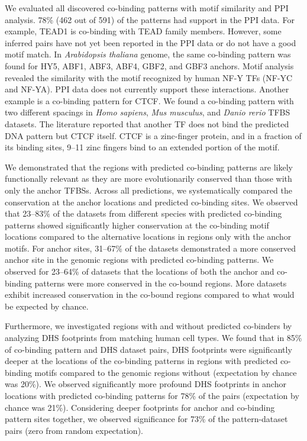 We evaluated all discovered co-binding patterns with motif similarity and PPI analysis. 78\% (462 out of 591) of the patterns had support in the PPI data. For example, TEAD1 is co-binding with TEAD family members. However, some inferred pairs have not yet been reported in the PPI data or do not have a good motif match. In \textit{Arabidopsis thaliana} genome, the same co-binding pattern was found for HY5, ABF1, ABF3, ABF4, GBF2, and GBF3 anchors. Motif analysis revealed the similarity with the motif recognized by human NF-Y TFs (NF-YC and NF-YA). PPI data does not currently support these interactions. Another example is a co-binding pattern for CTCF. We found a co-binding pattern with two different spacings in \textit{Homo sapiens}, \textit{Mus musculus}, and \textit{Danio rerio} TFBS datasets. The literature reported that another TF does not bind the predicted DNA pattern but CTCF itself. CTCF is a zinc-finger protein, and in a fraction of its binding sites, 9--11 zinc fingers bind to an extended portion of the motif.

We demonstrated that the regions with predicted co-binding patterns are likely functionally relevant as they are more evolutionarily conserved than those with only the anchor TFBSs. Across all predictions, we systematically compared the conservation at the anchor locations and predicted co-binding sites. We observed that 23--83\% of the datasets from different species with predicted co-binding patterns showed significantly higher conservation at the co-binding motif locations compared to the alternative locations in regions only with the anchor motifs. For anchor sites, 31--67\% of the datasets demonstrated a more conserved anchor site in the genomic regions with predicted co-binding patterns. We observed for 23--64\% of datasets that the locations of both the anchor and co-binding patterns were more conserved in the co-bound regions. More datasets exhibit increased conservation in the co-bound regions compared to what would be expected by chance.

Furthermore, we investigated regions with and without predicted co-binders by analyzing \ac{DHS} footprints from matching human cell types. We found that in 85\% of co-binding pattern and DHS dataset pairs, DHS footprints were significantly deeper at the locations of the co-binding patterns in regions with predicted co-binding motifs compared to the genomic regions without (expectation by chance was 20\%). We observed significantly more profound DHS footprints in anchor locations with predicted co-binding patterns for 78\% of the pairs (expectation by chance was 21\%). Considering deeper footprints for anchor and co-binding pattern sites together, we observed significance for 73\% of the pattern-dataset pairs (zero from random expectation).

